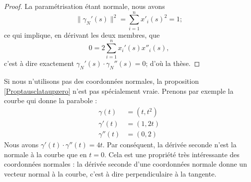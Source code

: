 \begin{proof}
    La paramétrisation étant normale, nous avons 
    \begin{equation}
        \| \gamma_N'(s) \|^2=\sum_{i=1}^nx'_i(s)^2=1;
    \end{equation}
    ce qui implique, en dérivant les deux membres, que
    \begin{equation}
        0=2\sum_{i=1}^nx_i'(s)x''_i(s),
    \end{equation}
    c'est à dire exactement $\gamma_N'(s)\cdot \gamma_N''(s)=0$; d'où la thèse.
\end{proof}

\begin{remark}
    Si nous n'utilisons pas des coordonnées normales, la proposition \ref{Proptausclataupzero} n'est pas spécialement vraie. Prenons par exemple la courbe qui donne la parabole :
    \begin{subequations}
        \begin{align}
            \gamma(t)&=(t,t^2)\\
            \gamma'(t)&=(1,2t)\\
            \gamma''(t)&=(0,2)
        \end{align}
    \end{subequations}
    Nous avons $\gamma'(t)\cdot \gamma''(t)=4t$. Par conséquent, la dérivée seconde n'est la normale à la courbe que en $t=0$. Cela est une propriété très intéressante des coordonnées normales : la dérivée seconde d'une coordonnées normale donne un vecteur normal à la courbe, c'est à dire perpendiculaire à la tangente.
\end{remark}

